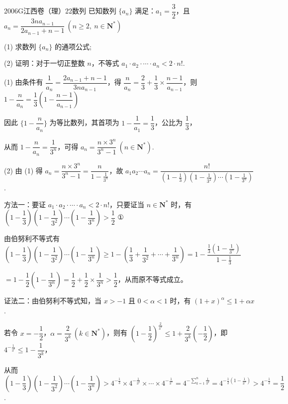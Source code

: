 
\begin{problem}{2006}{G}{江西卷（理）}{22}{数列}
已知数列 $\{a_n\}$ 满足：$a_1=\dfrac{3}{2}$，且 $a_n=\dfrac{3na_{n-1}}{2a_{n-1}+n-1}\ (n\ge 2,\ n\in \mathbf{N}^*)$

(1) 求数列 $\{a_n\}$ 的通项公式;

(2) 证明：对于一切正整数 $n$，不等式 $a_1\cdot a_2\cdot \cdots \cdot a_n < 2\cdot n!$.
\end{problem}

\begin{solutions}
(1) 由条件有 $\dfrac{1}{a_n}=\dfrac{2a_{n-1}+n-1}{3na_{n-1}}$，得 $\dfrac{n}{a_n}=\dfrac{2}{3}+\dfrac{1}{3}\times \dfrac{n-1}{a_{n-1}}$，则 $1-\dfrac{n}{a_n}=\dfrac{1}{3}(1-\dfrac{n-1}{a_{n-1}})$

因此 $\{1-\dfrac{n}{a_n}\}$ 为等比数列，其首项为 $1-\dfrac{1}{a_1}=\dfrac{1}{3}$，公比为 $\dfrac{1}{3}$，

从而 $1-\dfrac{n}{a_n}=\dfrac{1}{3^n}$，可得 $a_n=\dfrac{n\times 3^n}{3^n-1}\ (n\in \mathbf{N}^*)$.

(2) 由 (1) 得 $a_n=\dfrac{n\times 3^n}{3^n-1}=\dfrac{n}{1-\frac{1}{3^n}}$，故 $a_1 a_2 \cdots a_n = \dfrac{n!}{(1-\frac{1}{3})(1-\frac{1}{3^2})\cdots(1-\frac{1}{3^n})}$.

方法一：要证 $a_1\cdot a_2 \cdot \cdots \cdot a_n < 2\cdot n!$，只要证当 $n\in \mathbf{N}^*$ 时，有 $(1-\dfrac{1}{3})(1-\dfrac{1}{3^2})\cdots(1-\dfrac{1}{3^n}) > \dfrac{1}{2}$ ①

由伯努利不等式有 $(1-\dfrac{1}{3})(1-\dfrac{1}{3^2})\cdots(1-\dfrac{1}{3^n}) \ge 1-(\dfrac{1}{3}+\dfrac{1}{3^2}+\cdots+\dfrac{1}{3^n}) = 1-\dfrac{\frac{1}{3}(1-\frac{1}{3^n})}{1-\frac{1}{3}}$

$=1-\dfrac{1}{2}(1-\dfrac{1}{3^n})=\dfrac{1}{2}+\dfrac{1}{2}\times \dfrac{1}{3^n} > \dfrac{1}{2}$，从而原不等式成立。

证法二：由伯努利不等式知，当 $x>-1$ 且 $0<\alpha<1$ 时，有 $(1+x)^{\alpha} \le 1+\alpha x$.

若令 $x=-\dfrac{1}{2}$，$\alpha=\dfrac{2}{3^k}\ (k\in \mathbf{N}^*)$，则有 $(1-\dfrac{1}{2})^{\frac{2}{3^k}} \le 1+\dfrac{2}{3^k}(-\dfrac{1}{2})$，即 $4^{-\frac{1}{3^k}} \le 1-\dfrac{1}{3^k}$，

从而 $(1-\dfrac{1}{3})(1-\dfrac{1}{3^2})\cdots(1-\dfrac{1}{3^n}) > 4^{-\frac{1}{3}}\times 4^{-\frac{1}{3^2}}\times \cdots \times 4^{-\frac{1}{3^n}} = 4^{-\sum_{k=1}^n \frac{1}{3^k}} = 4^{-\frac{1}{2}(1-\frac{1}{3^n})} > 4^{-\frac{1}{2}} = \dfrac{1}{2}$.


\end{solutions}
